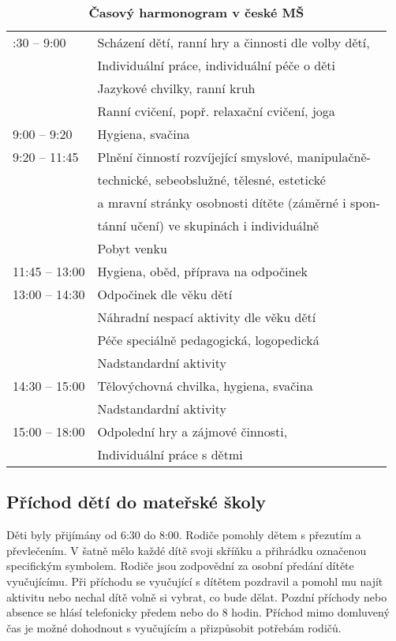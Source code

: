 		\begin{spacing}{1.0}
		\begin{table}[h!]
			\center
			\begin{tabular}{|l l|}
				\rowcolor{white}
				\hline
			6:30 – 9:00				& Scházení dětí, ranní hry a činnosti dle volby dětí, 	\\ 
									& Individuální práce, individuální péče o děti\\
									& Jazykové chvilky, ranní kruh 	\\
									& Ranní cvičení, popř. relaxační cvičení, joga \\
			9:00 – 9:20				& Hygiena, svačina	\\
			9:20 – 11:45			& Plnění činností rozvíjející smyslové, manipulačně-	\\
									& technické, sebeobslužné, tělesné, estetické \\
									& a mravní stránky osobnosti dítěte (záměrné i spon- \\
									& tánní učení) ve skupinách i individuálně \\
									& Pobyt venku					\\
			11:45 – 13:00			& Hygiena, oběd, příprava na odpočinek					\\
			13:00 – 14:30			& Odpočinek dle věku dětí						\\
									& Náhradní nespací aktivity dle věku dětí 				\\
									& Péče speciálně pedagogická, logopedická				\\ 
									& Nadstandardní aktivity 							 \\
			14:30 – 15:00			& Tělovýchovná chvilka, hygiena, svačina 			\\
									& Nadstandardní aktivity 		\\
			15:00 – 18:00			& Odpolední hry a zájmové činnosti, \\
									& Individuální práce s dětmi\\
			\hline
			\end{tabular}
			\caption{ \textbf{Časový harmonogram v české MŠ}
			}
			\label{tab:rezimDneCR}
		\end{table}
		\end{spacing}

		\subsection{Příchod dětí do mateřské školy}
			
			Děti byly přijímány od 6:30 do 8:00. Rodiče pomohly dětem s přezutím a převlečením. V šatně mělo každé dítě svoji skříňku a přihrádku označenou specifickým symbolem. Rodiče jsou zodpovědní za osobní předání dítěte vyučujícímu. Při příchodu se vyučující s dítětem pozdravil a pomohl mu najít aktivitu nebo nechal dítě volně si vybrat, co bude dělat. Pozdní příchody nebo absence se hlásí telefonicky předem nebo do 8 hodin. Příchod mimo domluvený čas je možné dohodnout s vyučujícím a přizpůsobit potřebám rodičů.


